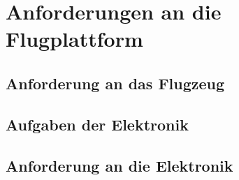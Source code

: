 \chapter{Anforderungen an die Flugplattform}\label{cha:Anforderungen an die Flugplattform}

\section{Anforderung an das Flugzeug}

\section{Aufgaben der Elektronik}

\section{Anforderung an die Elektronik}